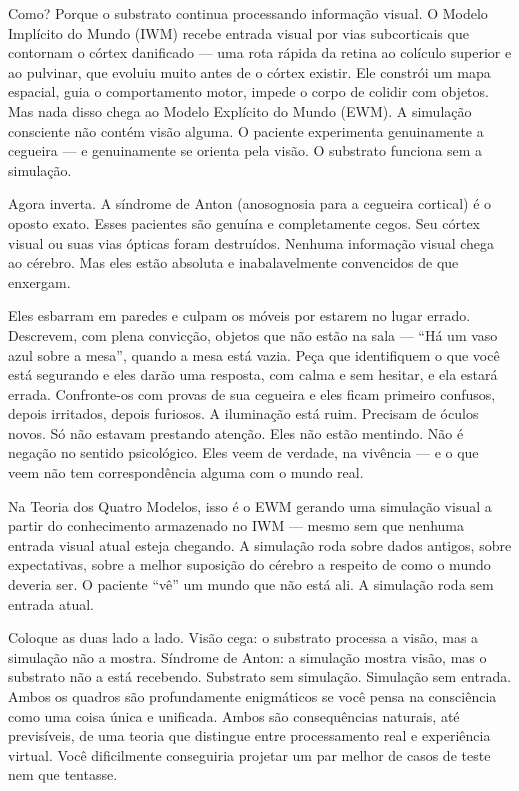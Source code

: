 \documentclass[11pt, twoside, openright]{book}
\begin{document}
Como? Porque o substrato continua processando informação visual. O Modelo Implícito do Mundo (IWM) recebe entrada visual por vias subcorticais que contornam o córtex danificado --- uma rota rápida da retina ao colículo superior e ao pulvinar, que evoluiu muito antes de o córtex existir. Ele constrói um mapa espacial, guia o comportamento motor, impede o corpo de colidir com objetos. Mas nada disso chega ao Modelo Explícito do Mundo (EWM). A simulação consciente não contém visão alguma. O paciente experimenta genuinamente a cegueira --- e genuinamente se orienta pela visão. O substrato funciona sem a simulação.

Agora inverta. A síndrome de Anton (anosognosia para a cegueira cortical) é o oposto exato. Esses pacientes são genuína e completamente cegos. Seu córtex visual ou suas vias ópticas foram destruídos. Nenhuma informação visual chega ao cérebro. Mas eles estão absoluta e inabalavelmente convencidos de que enxergam.

Eles esbarram em paredes e culpam os móveis por estarem no lugar errado. Descrevem, com plena convicção, objetos que não estão na sala --- ``Há um vaso azul sobre a mesa'', quando a mesa está vazia. Peça que identifiquem o que você está segurando e eles darão uma resposta, com calma e sem hesitar, e ela estará errada. Confronte-os com provas de sua cegueira e eles ficam primeiro confusos, depois irritados, depois furiosos. A iluminação está ruim. Precisam de óculos novos. Só não estavam prestando atenção. Eles não estão mentindo. Não é negação no sentido psicológico. Eles veem de verdade, na vivência --- e o que veem não tem correspondência alguma com o mundo real.

Na Teoria dos Quatro Modelos, isso é o EWM gerando uma simulação visual a partir do conhecimento armazenado no IWM --- mesmo sem que nenhuma entrada visual atual esteja chegando. A simulação roda sobre dados antigos, sobre expectativas, sobre a melhor suposição do cérebro a respeito de como o mundo deveria ser. O paciente ``vê'' um mundo que não está ali. A simulação roda sem entrada atual.

Coloque as duas lado a lado. Visão cega: o substrato processa a visão, mas a simulação não a mostra. Síndrome de Anton: a simulação mostra visão, mas o substrato não a está recebendo. Substrato sem simulação. Simulação sem entrada. Ambos os quadros são profundamente enigmáticos se você pensa na consciência como uma coisa única e unificada. Ambos são consequências naturais, até previsíveis, de uma teoria que distingue entre processamento real e experiência virtual. Você dificilmente conseguiria projetar um par melhor de casos de teste nem que tentasse.
\end{document}
